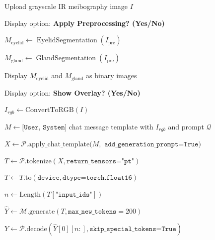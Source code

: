 \documentclass{article}
\begin{document}

\begin{algorithm}[H]
\caption{Workflow for IR Meibography Segmentation}
\label{alg:meibomian_gland_segmentation}


Upload grayscale IR meibography image $I$\;

Display option: \textbf{Apply Preprocessing? (Yes/No)}\;


$M_{\mathrm{eyelid}} \gets
\operatorname{EyelidSegmentation}(I_{\mathrm{pre}})$\;

$M_{\mathrm{gland}} \gets
\operatorname{GlandSegmentation}(I_{\mathrm{pre}})$\;

Display $M_{\mathrm{eyelid}}$ and $M_{\mathrm{gland}}$ as binary images\;

Display option: \textbf{Show Overlay? (Yes/No)}\;


\end{algorithm}


\begin{algorithm}[H]
    \caption{Inference Pipeline using Fine-Tuned \texttt{medgemma-mgd1k} Model}
    \label{alg:llm_invocation}


$I_{rgb} \gets \text{ConvertToRGB}(I)$\;

$M \gets \texttt{[User, System]}$ chat message template with $I_{rgb}$ and prompt $\mathcal{Q}$\;

$X \gets \mathcal{P}.\text{apply\_chat\_template}(M,$
$\texttt{add\_generation\_prompt=True})$\;

$T \gets \mathcal{P}.\text{tokenize}(X,\texttt{return\_tensors="pt"})$\;

$T \gets T.\text{to}(\texttt{device},\texttt{dtype=torch.float16})$\;

$n \gets \text{Length}(T[\texttt{"input\_ids"}])$\;

$\hat{Y} \gets \mathcal{M}.\text{generate}(T,\texttt{max\_new\_tokens}=200)$\;

$Y \gets \mathcal{P}.\text{decode}(\hat{Y}[0][n:],\texttt{skip\_special\_tokens=True})$\;

\;

\end{algorithm}
\end{document}
